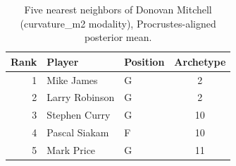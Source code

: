 \begin{table}[htbp]
  \centering\small
  \begin{tabular}{rllc}
    \toprule
    Rank & Player & Position & Archetype \\
    \midrule
    1 & Mike James & G & 2 \\
    2 & Larry Robinson & G & 2 \\
    3 & Stephen Curry & G & 10 \\
    4 & Pascal Siakam & F & 10 \\
    5 & Mark Price & G & 11 \\
    \bottomrule
  \end{tabular}
  \caption{Five nearest neighbors of Donovan Mitchell (curvature_m2 modality), Procrustes-aligned posterior mean.}
  \label{tab:Donovan_Mitchell_neighbors_curvature_m2}
\end{table}

